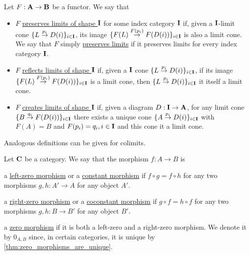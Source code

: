 \begin{definition}\label{def:categorical_limit_preservation}\cite[definitions 5.3.1, 5.3.5]{Leinster2014}
  Let $F: \operatorname{\mathbf{A}} \to \operatorname{\mathbf{B}}$ be a functor. We say that
  \begin{itemize}
    \item $F$ \uline{preserves limits of shape $\operatorname{\mathbf{I}}$} for some index category $\operatorname{\mathbf{I}}$ if, given a $\operatorname{\mathbf{I}}$-limit cone \mbox{$\{ L \overset {p_i} \to D(i) \}_{i \in \operatorname{\mathbf{I}}}$}, its image \mbox{$\{ F(L) \overset {F(p_i)} \to F(D(i)) \}_{i \in \operatorname{\mathbf{I}}}$} is also a limit cone. We say that $F$ simply \uline{preserves limits} if it preserves limits for every index category $\operatorname{\mathbf{I}}$.

    \item $F$ \uline{reflects limits of shape $\operatorname{\mathbf{I}}$} if, given a $\operatorname{\mathbf{I}}$ cone \mbox{$\{ L \overset {p_i} \to D(i) \}_{i \in \operatorname{\mathbf{I}}}$}, if its image \mbox{$\{ F(L) \overset {F(p_i)} \to F(D(i)) \}_{i \in \operatorname{\mathbf{I}}}$} is a limit cone, then \mbox{$\{ L \overset {p_i} \to D(i) \}_{i \in \operatorname{\mathbf{I}}}$} it itself a limit cone.

    \item $F$ \uline{creates limits of shape $\operatorname{\mathbf{I}}$} if, given a diagram $D: \operatorname{\mathbf{I}} \to \operatorname{\mathbf{A}}$, for any limit cone \mbox{$\{ B \overset {q_i} \to F(D(i)) \}_{i \in \operatorname{\mathbf{I}}}$} there exists a unique cone \mbox{$\{ A \overset {p_i} \to D(i) \}_{i \in \operatorname{\mathbf{I}}}$} with $F(A) = B$ and $F(p_i) = q_i, i \in \operatorname{\mathbf{I}}$ and this cone it a limit cone.
  \end{itemize}
\end{definition}

\begin{note}\label{note:categorical_colimit_preservation}
  Analogous definitions can be given for colimits.
\end{note}

\begin{definition}\label{def:zero_morphism}
  Let $\operatorname{\mathbf{C}}$ be a category. We say that the morphism $f: A \to B$ is
  \begin{defenum}
    \item\label{def:zero_morphism/left} a \uline{left-zero morphism} or a \uline{constant morphism} if $f \circ g = f \circ h$ for any two morphisms $g, h: A' \to A$ for any object $A'$.
    \item\label{def:zero_morphism/right} a \uline{right-zero morphism} or a \uline{coconstant morphism} if $g \circ f = h \circ f$ for any two morphisms $g, h: B \to B'$ for any object $B'$.
    \item\label{def:zero_morphism/bidirectional} a \uline{zero morphism} if it is both a left-zero and a right-zero morphism. We denote it by $0_{A,B}$ since, in certain categories, it is unique by \cref{thm:zero_morphisms_are_unique}.
  \end{defenum}
\end{definition}


